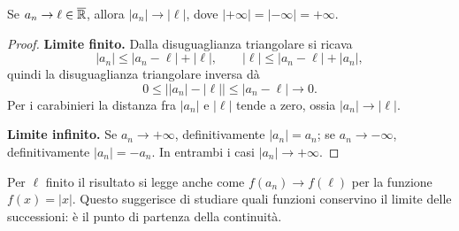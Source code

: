 \begin{proposizione}
\label{prop:limite-modulo}
Se $a_n\to\ell\in\overline{\mathbb{R}}$, allora $|a_n|\to|\ell|$, dove $|+\infty|=|-\infty|=+\infty$.
\end{proposizione}
\begin{proof}
\textbf{Limite finito.} Dalla disuguaglianza triangolare si ricava
\[
|a_n|\le|a_n-\ell|+|\ell|,\qquad
|\ell|\le|a_n-\ell|+|a_n|,
\]
quindi la disuguaglianza triangolare inversa dà
\[
0\le\bigl||a_n|-|\ell|\bigr|\le|a_n-\ell|\longrightarrow0.
\]
Per i carabinieri la distanza fra $|a_n|$ e $|\ell|$ tende a zero, ossia $|a_n|\to|\ell|$.

\textbf{Limite infinito.} Se $a_n\to+\infty$, definitivamente $|a_n|=a_n$; se $a_n\to-\infty$, definitivamente $|a_n|=-a_n$. In entrambi i casi $|a_n|\to+\infty$.
\end{proof}

Per $\ell$ finito il risultato si legge anche come $f(a_n)\to f(\ell)$ per la funzione $f(x)=|x|$. Questo suggerisce di studiare quali funzioni conservino il limite delle successioni: è il punto di partenza della continuità.
